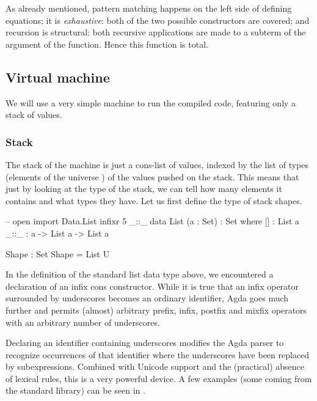 \noindent As already mentioned, pattern matching happens on the left side of defining equations;
it is \emph{exhaustive}: both of the two possible constructors are covered; and recursion
is structural: both recursive applications are made to a subterm of the argument of the function.
Hence this function is total.

\subsection{Virtual machine}

We will use a very simple machine to run the compiled code, featuring only a stack
of values.

\subsubsection{Stack}

The stack of the machine is just a cons-list of values, indexed by the list
of types (elements of the universe ) of the values pushed on the stack.
This means that just by looking at the type of the stack, we can tell how many
elements it contains and what types they have. Let us first define the type
of stack shapes.
\begin{code}
  -- open import Data.List
  infixr 5 _::_
  data List (a : Set) : Set where
    [] : List a
    _::_ : a -> List a -> List a
\end{code}
\begin{code}
  Shape : Set
  Shape = List U
\end{code}
\label{sec:fixity} In the definition of the standard list data type above,
we encountered a declaration of an infix cons constructor. While it is true that
an infix operator surrounded by underscores becomes an ordinary identifier,
Agda goes much further and permits (almost) arbitrary prefix, infix, postfix
and mixfix operators with an arbitrary number of underscores.

Declaring an identifier containing underscores modifies the Agda parser
to recognize occurrences of that identifier where the underscores have been
replaced by subexpressions. Combined with Unicode support and the (practical) absence
of lexical rules, this is a very powerful device. A few examples (some coming
from the standard library) can be seen
in .

